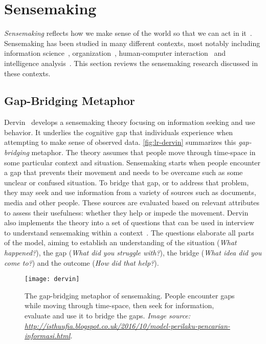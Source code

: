 \section{Sensemaking}
\label{sub:lr-sensemaking}
\emph{Sensemaking} reflects how we make sense of the world so that we can act in it~\cite{Snowden2005}. Sensemaking has been studied in many different contexts, most notably including information science~\cite{Dervin1983}, organization~\cite{Weick1995}, human-computer interaction~\cite{Russell1993} and intelligence analysis~\cite{Pirolli2005,Klein2003}. This section reviews the sensemaking research discussed in these contexts.

\subsection{Gap-Bridging Metaphor}
Dervin~\cite{Dervin1983} develops a sensemaking theory focusing on information seeking and use behavior. It underlies the cognitive gap that individuals experience when attempting to make sense of observed data. \autoref{fig:lr-dervin} summarizes this \emph{gap-bridging} metaphor. The theory assumes that people move through time-space in some particular context and situation. Sensemaking starts when people encounter a gap that prevents their movement and needs to be overcame such as some unclear or confused situation. To bridge that gap, or to address that problem, they may seek and use information from a variety of sources such as documents, media and other people. These sources are evaluated based on relevant attributes to assess their usefulness: whether they help or impede the movement. Dervin also implements the theory into a set of questions that can be used in interview to understand sensemaking within a context~\cite{Dervin1983}. The questions elaborate all parts of the model, aiming to establish an understanding of the situation (\emph{What happened?}), the gap (\emph{What did you struggle with?}), the bridge (\emph{What idea did you come to?}) and the outcome (\emph{How did that help?}).

\begin{figure}
	\centering
	\texttt{[image: dervin]}
	\caption[The gap-bridging metaphor of sensemaking]{The gap-bridging metaphor of sensemaking. People encounter gaps while moving through time-space, then seek for information, evaluate and use it to bridge the gaps. \textit{Image source: \url{http://isthuufia.blogspot.co.uk/2016/10/model-perilaku-pencarian-informasi.html}.}}
	\label{fig:lr-dervin}
\end{figure}

